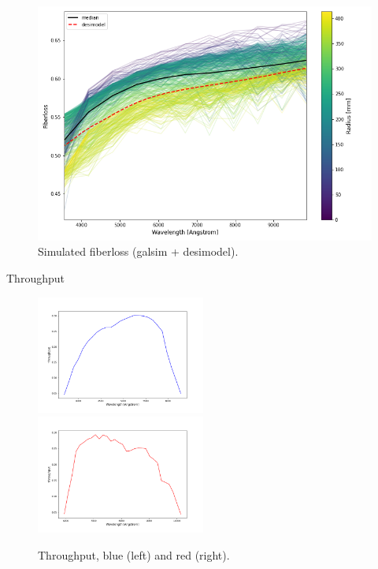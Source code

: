 \begin{figure}[h]
\centering
\includegraphics[width=14cm]{images/specsim/desimodel-qso-fiberloss.png}
\caption{Simulated fiberloss (galsim + desimodel).}
\label{fig:desimodel_qso_floss}
\end{figure}

Throughput

\begin{figure}[h]
    \centering
    \includegraphics[width=0.495\textwidth]{images/specsim/throughput_blue.png}
    \includegraphics[width=0.495\textwidth]{images/specsim/throughput_red.png}
    \caption{Throughput, blue (left) and red (right).}
    \label{fig:throughput}
\end{figure}

